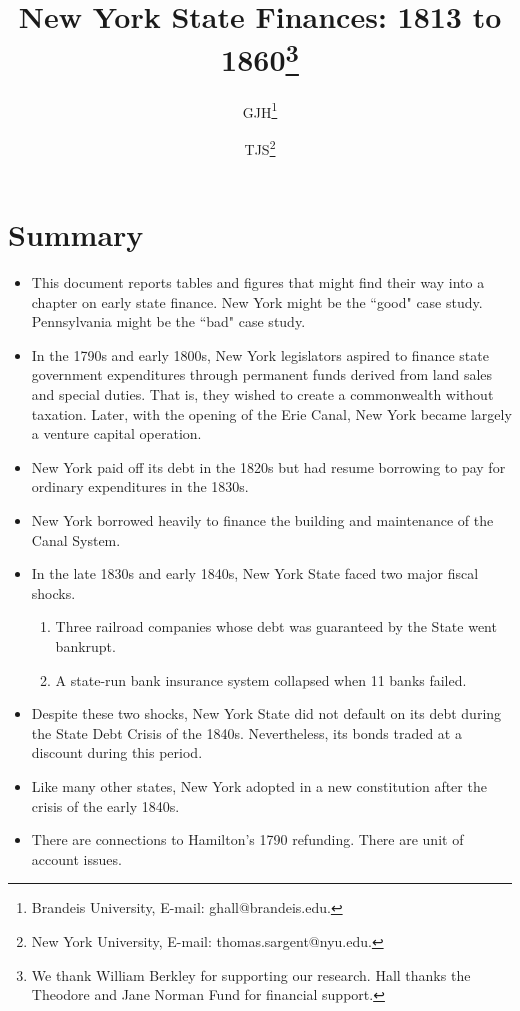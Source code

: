 \documentclass[11pt]{article}
\title{New York State Finances: 1813 to 1860\footnote{ 
We thank William Berkley for supporting our research. 
Hall thanks the Theodore and Jane Norman Fund for financial support.}}
\author{GJH\footnote{Brandeis University, E-mail: ghall@brandeis.edu.} \and
TJS\footnote{New York University, E-mail: thomas.sargent@nyu.edu.}}
\begin{document}
\graphicspath{{figures/}}

\maketitle
\thispagestyle{empty}




\section{Summary}

\begin{itemize}

\item This document reports tables and figures that might find their way into 
a chapter on early state finance.  New York might be the ``good" case study.  Pennsylvania might
be the ``bad" case study.

\item In the 1790s and early 1800s, New York legislators aspired to finance state 
government expenditures through permanent funds derived from land sales and 
special duties.  That is, they wished to create a commonwealth without 
taxation.  Later, with the opening of the Erie Canal, New York became largely 
a venture capital operation.

\item New York paid off its debt in the 1820s but had resume borrowing to pay for ordinary expenditures in the 1830s.

\item New York borrowed heavily to finance the building and maintenance of the Canal System.  

\item In the late 1830s and early 1840s, New York State faced two major fiscal shocks.
\begin{enumerate}
\item Three railroad companies whose debt was guaranteed by the State went bankrupt.
\item A state-run bank insurance system collapsed when 11 banks failed.
\end{enumerate}

\item Despite these two shocks, New York State did not default on its debt during the State Debt Crisis of the 1840s.
Nevertheless, its bonds traded at a discount during this period.

\item Like many other states, New York adopted in a new constitution after the crisis of the early 1840s. 

\item There are connections to Hamilton's 1790 refunding. There are unit of account issues.

\end{itemize}
\end{document}
